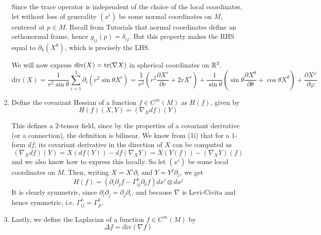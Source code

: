 \documentclass[a4paper, 12pt]{article}
\begin{document}
\begin{Exercise}
\begin{enumerate}[label=(\roman*)]
            Since the trace operator is independent of the choice of the local coordinates,
            let without loss of generality $(x^i)$ be some normal coordinates on $M$,
            centered at $p \in M$.
            Recall from Tutorials that normal coordinates define an orthonormal frame,
            hence $g_{ij}(p) = \delta_{ij}$.
            But this property makes the RHS equal to $\partial_k(X^k)$,
            which is precisely the LHS.

            We will now express $\text{div}(X) = \operatorname{tr}(\nabla X)$ in spherical coordinates on $\mathbb{R}^3$.
            \[
                \text{div}(X)
                = \frac{1}{r^2\sin\theta}\sum_{i = 1}^{3} \partial_i (r^2\sin\theta X^i)
                = \frac{1}{r^2} (r^2 \frac{\partial X^r}{\partial r} + 2rX^r) + \frac{1}{\sin\theta} (\sin\theta \frac{\partial X^\theta}{\partial \theta} + \cos\theta X^\theta) + \frac{\partial X^\varphi}{\partial \varphi}
            \]
        \item Define the covariant Hessian of a function $f \in C^\infty(M)$ as $H(f)$, given by
            \[
                H(f)(X,Y) = (\nabla_X df)(Y)
            \]
            
            This defines a $2$-tensor field, since by the properties of a covariant derivative (or a connection),
            the definition is bilinear.
            We know from (1i) that for a $1$-form $df$, its covariant derivative in the direction of $X$ can be computed as
            \[
                (\nabla_X df)(Y) = X(df(Y)) - df(\nabla_XY) = X(Y(f)) - (\nabla_XY)(f)
            \]
            and we also know how to express this locally.
            So let $(x^i)$ be some local coordinates on $M$.
            Then, writing $X = X^i\partial_i$ and $Y = Y^j\partial_j$, we get
            \[
                H(f) = (\partial_i\partial_j f - \Gamma_{ij}^k\partial_k f)dx^i \otimes dx^j
            \]
            It is clearly symmetric, since $\partial_i\partial_j = \partial_j\partial_i$,
            and because $\nabla$ is Levi-Civita and hence symmetric, i.e. $\Gamma_{ij}^k = \Gamma_{ji}^k$.
        \item Lastly, we define the Laplacian of a function $f \in C^\infty(M)$ by
            \[
                \Delta f = \text{div}(\nabla f)
            \]
            

\end{enumerate}
\end{Exercise}
\end{document}

